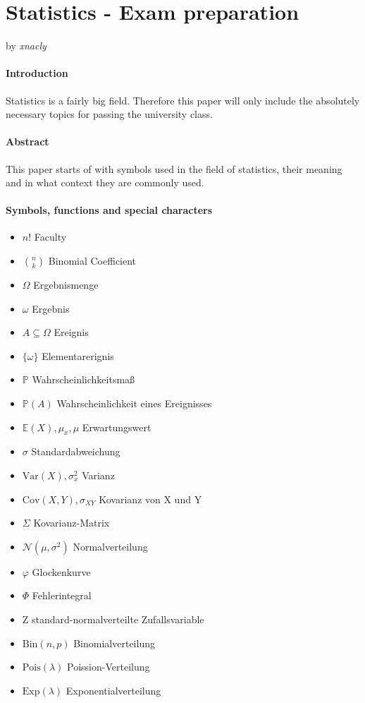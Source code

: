 \documentclass[twoside, a4paper, twocolumn]{article}
\begin{document}
    \section*{Statistics - Exam preparation}
    by \textit{xnacly}
    \paragraph{Introduction}
    Statistics is a fairly big field. Therefore this paper will only include
    the absolutely necessary topics for passing the university class.

    \paragraph{Abstract}
    This paper starts of with symbols used in the field of statistics, their
    meaning and in what context they are commonly used. 

    \paragraph{Symbols, functions and special characters}

    \begin{itemize}
       \item $n!$  Faculty 
       \item $\binom{n}{k}$  Binomial Coefficient 
       \item $\Omega$  Ergebnismenge 
       \item $\omega$  Ergebnis 
       \item $A \subseteq \Omega$  Ereignis 
       \item $\{\omega\}$  Elementarerignis 
       \item $\mathbb{P}$  Wahrscheinlichkeitsmaß 
       \item $\mathbb{P}(A)$  Wahrscheinlichkeit eines Ereignisses 
       \item $\mathbb{E}(X), \mu_x, \mu$  Erwartungswert 
       \item $\sigma$  Standardabweichung 
       \item $\mathrm{Var}(X), \sigma^2_x$  Varianz 
       \item $\mathrm{Cov}(X,Y), \sigma_{XY}$  Kovarianz von X und Y 
       \item $\Sigma$  Kovarianz-Matrix 
       \item $\mathcal{N}(\mu, \sigma^2)$  Normalverteilung
       \item $\varphi$  Glockenkurve 
       \item $\Phi$  Fehlerintegral
       \item $\mathrm{Z}$  standard-normalverteilte Zufallsvariable
       \item $\textrm{Bin}(n, p)$  Binomialverteilung
       \item $\textrm{Pois}(\lambda)$  Poission-Verteilung
       \item $\textrm{Exp}(\lambda)$  Exponentialverteilung
    \end{itemize}
\end{document}
